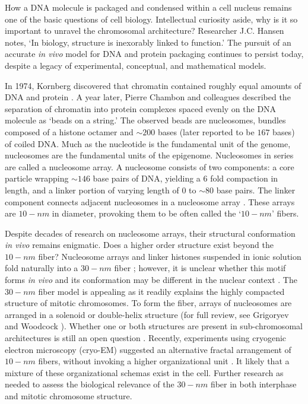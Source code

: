 How a \gls{DNA} molecule is packaged and condensed within a cell nucleus remains one of the basic questions of cell biology.  Intellectual curiosity aside,
why is it so important to unravel the chromosomal architecture?  Researcher J.C. Hansen notes, `In biology, structure is inexorably linked to function.' \citep{hansen2012}
The pursuit of an accurate \textit{\gls{in vivo}} model for \gls{DNA} and protein packaging continues to persist today, despite a legacy of experimental,
conceptual, and mathematical models.

In 1974, Kornberg discovered that chromatin contained roughly equal amounts of \gls{DNA} and protein \citep{kornberg1974}.  A year later, Pierre Chambon
and colleagues described the separation of chromatin into protein complexes spaced evenly on the \gls{DNA} molecule as `beads on a string.' \citep{oudet1975}
The observed beads are nucleosomes, bundles composed of a histone octamer and $\sim200$ bases (later reported to be $167$ bases) \citep{robinson2006} of
coiled \gls{DNA}. Much as the nucleotide is the fundamental unit of the genome, nucleosomes are the fundamental units of the epigenome.  Nucleosomes in
series are called a \gls{nucleosome array}.  A nucleosome consists of two components: a core particle wrapping $\sim146$ base pairs of DNA, yielding a
6 fold compaction in length, and a linker portion of varying length of $0$ to $\sim80$ base pairs.  The linker component connects adjacent nucleosomes
in a nucleosome array \citep{wu2007, hansen2012}.  These arrays are $10-nm$ in diameter, provoking them to be often called the `$10-nm$' fibers.

Despite decades of research on nucleosome arrays, their structural conformation \textit{\gls{in vivo}} remains enigmatic.   Does a higher order structure
exist beyond the $10-nm$ fiber?  Nucleosome arrays and linker histones suspended in ionic solution fold naturally into a $30-nm$ fiber \citep{tremethick2007};
however, it is unclear whether this motif forms \textit{\gls{in vivo}} and its conformation may be different in the nuclear context \citep{bian2012}.
The $30-nm$ fiber model is appealing as it readily explains the highly compacted structure of mitotic chromosomes.  To form the fiber, arrays of nucleosomes
are arranged in a solenoid or double-helix structure (for full review, see Grigoryev and Woodcock \citep{grigoryev2012}).  Whether one or both structures
are present in sub-chromosomal architectures is still an open question \citep{song2014}.  Recently, experiments using cryogenic electron microscopy
(cryo-EM) suggested an alternative fractal arrangement of $10-nm$ fibers, without invoking a higher organizational unit \citep{nishino2012,hansen2012}.
It likely that a mixture of these organizational schemas exist in the cell.  Further research as needed to assess the biological relevance of the $30-nm$ fiber in
both interphase and mitotic chromosome structure.

